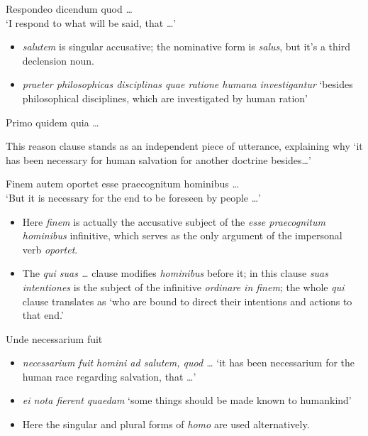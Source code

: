 \documentclass[a4paper, 12pt]{article}
\newcommand{\form}[1]{\emph{#1}}
\newcommand{\translate}[1]{`#1'}
\begin{document}
\begin{exe}
    \ex Respondeo dicendum quod \dots \\ 
    \translate{I respond to what will be said, that \dots}
\end{exe}

\begin{itemize}
    \item \form{salutem} is singular accusative; the nominative form is \form{salus}, 
    but it's a third declension noun.
    \item \form{praeter philosophicas disciplinas quae ratione humana investigantur} 
        \translate{besides philosophical disciplines, which are investigated by human ration}
\end{itemize}

\begin{exe}
    \ex Primo quidem quia \dots
\end{exe}

This reason clause stands as an independent piece of utterance, 
explaining why \translate{it has been necessary for human salvation for another doctrine besides\dots} 

\begin{exe}
    \ex Finem autem oportet esse praecognitum hominibus \dots \\
    \translate{But it is necessary for the end to be foreseen by people \dots}
\end{exe}

\begin{itemize}
    \item Here \form{finem} is actually the accusative subject of the 
        \form{esse praecognitum hominibus} infinitive,
        which serves as the only argument of the impersonal verb \form{oportet}.
    \item The \form{qui suas \dots} clause modifies \form{hominibus} before it;
        in this clause \form{suas intentiones} is the subject of the 
        infinitive \form{ordinare in finem}; 
        the whole \form{qui} clause translates as 
        \translate{who are bound to direct their intentions and actions to that end.}
\end{itemize}

\begin{exe}
    \ex Unde necessarium fuit 
\end{exe}

\begin{itemize}
    \item \form{necessarium fuit homini ad salutem, quod \dots} 
    \translate{it has been necessarium for the human race regarding salvation, that \dots}
    \item \form{ei nota fierent quaedam} 
    \translate{some things should be made known to humankind} 
    \item Here the singular and plural forms of \form{homo}
    are used alternatively.
\end{itemize}
\end{document}
